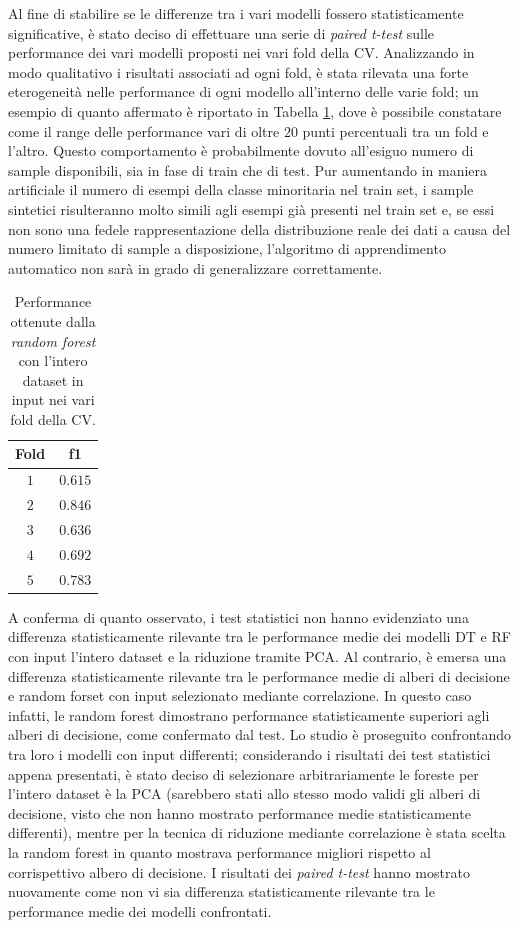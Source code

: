 Al fine di stabilire se le differenze tra i vari modelli fossero statisticamente significative, è stato deciso di effettuare una serie di \textit{paired t-test} sulle performance dei vari modelli proposti nei vari fold della CV.
Analizzando in modo qualitativo i risultati associati ad ogni fold, è stata rilevata una forte eterogeneità nelle performance di ogni modello all'interno delle varie fold; un esempio di quanto affermato è riportato in Tabella \ref{tab:f1fold}, dove è possibile constatare come il range delle performance vari di oltre $20$ punti percentuali tra un fold e l'altro. Questo comportamento è probabilmente dovuto all'esiguo numero di sample disponibili, sia in fase di train che di test. Pur aumentando in maniera artificiale il numero di esempi della classe minoritaria nel train set, i sample sintetici risulteranno molto simili agli esempi già presenti nel train set e, se essi non sono una fedele rappresentazione della distribuzione reale dei dati a causa del numero limitato di sample a disposizione, l'algoritmo di apprendimento automatico non sarà in grado di generalizzare correttamente. 
\begin{table}
	\centering
	\caption{Performance ottenute dalla \textit{random forest} con l'intero dataset in input nei vari fold della CV.}
	\label{tab:f1fold}
	\begin{tabular}{|c|c|}
		\hline 
		Fold & f1 \\ 
		\hline 
		$1$ & $0.615$ \\ 
		\hline 
		$2$ & $0.846$ \\ 
		\hline 
		$3$ & $0.636$ \\ 
		\hline 
		$4$ & $0.692$ \\ 
		\hline 
		$5$ & $0.783$ \\ 
		\hline 
	\end{tabular} 
\end{table}
A conferma di quanto osservato, i test statistici non hanno evidenziato una differenza statisticamente rilevante tra le performance medie dei modelli DT e RF con input l'intero dataset e la riduzione tramite PCA. Al contrario, è emersa una differenza statisticamente rilevante tra le performance medie di alberi di decisione e random forset con input selezionato mediante correlazione. In questo caso infatti, le random forest dimostrano performance statisticamente superiori agli alberi di decisione, come confermato dal test.
Lo studio è proseguito confrontando tra loro i modelli con input differenti; considerando i risultati dei test statistici appena presentati, è stato deciso di selezionare arbitrariamente le foreste per l'intero dataset è la PCA (sarebbero stati allo stesso modo validi gli alberi di decisione, visto che non hanno mostrato performance medie statisticamente differenti), mentre per la tecnica di riduzione mediante correlazione è stata scelta la random forest in quanto mostrava performance migliori rispetto al corrispettivo albero di decisione. I risultati dei \textit{paired t-test} hanno mostrato nuovamente come non vi sia differenza statisticamente rilevante tra le performance medie dei modelli confrontati.


